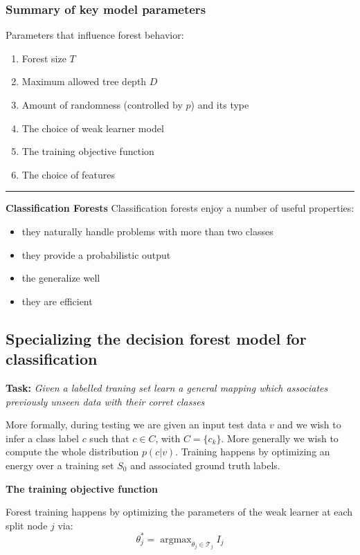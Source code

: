\documentclass{scrartcl}
\DeclareMathOperator*{\argmax}{argmax} %
\begin{document}
\begin{appendices}
\subsubsection{Summary of key model parameters}
Parameters that influence forest behavior:
\begin{enumerate}
    \item
        Forest size \(T\)
    \item
        Maximum allowed tree depth \(D\)
    \item
        Amount of randomness (controlled by \(p\)) and its type
    \item
        The choice of weak learner model
    \item
        The training objective function
    \item
        The choice of features
\end{enumerate}

\rule{\textwidth}{1pt}
\textbf{Classification Forests}
Classification forests enjoy a number of useful properties:
\begin{itemize}
    \item
        they naturally handle problems with more than two classes 
    \item
        they provide a probabilistic output
    \item
        the generalize well
    \item
        they are efficient
\end{itemize}

\subsection{Specializing the decision forest model for classification}
\textbf{Task:}
\textit{Given a labelled traning set learn a general mapping which associates previously unseen data with their corret classes}

More formally, during testing we are given an input test data \(v\) and we wish to infer a class label \(c\) such that \(c \in C\), with \(C = \{c_k\}\). More generally we wish to compute the whole distribution \(p(c|v)\). Training happens by optimizing an energy over a training set \(S_0\) and associated ground truth labels.

\bigbreak

\textbf{The training objective function}

Forest training happens by optimizing the parameters of the weak learner at each split node \(j\) via:
\[\theta_j^* = \argmax_{\theta_j \in \mathcal{T}_j} I_j\]


\end{appendices}
\end{document}
